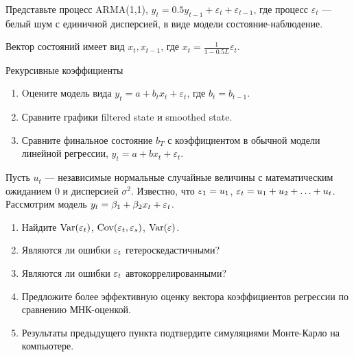 \begin{problem}
Представьте процесс ARMA(1,1),
$y_{t}=0.5y_{t-1}+\varepsilon_{t}+\varepsilon_{t-1}$,
где процесс $\varepsilon_t$ —  белый шум с единичной дисперсией, в
виде модели состояние-наблюдение.

Вектор состояний имеет вид $x_{t},x_{t-1}$, где
$x_{t}=\frac{1}{1-0.5L}\varepsilon_{t}$.


\begin{sol}
\end{sol}
\end{problem}



\begin{problem}
Рекурсивные коэффициенты
\begin{enumerate}
\item Oцените модель вида $y_{t}=a+b_{t}x_{t}+\varepsilon_{t}$,
где $b_{t}=b_{t-1}$.
\item Сравните графики filtered state и smoothed state.
\item Сравните финальное состояние $b_{T}$ с коэффициентом в
обычной модели линейной регрессии, $y_{t}=a+bx_{t}+\varepsilon_{t}$.
\end{enumerate}


\begin{sol}
\end{sol}
\end{problem}



\begin{problem}
Пусть $u_t$ — независимые нормальные случайные величины с
математическим ожиданием $0$ и дисперсией $\sigma^2$. Известно, что $\varepsilon_1=u_1$, $\varepsilon_t=u_1+u_2+\ldots+u_t$. Рассмотрим модель $y_t=\beta_1+\beta_2 x_t + \varepsilon_t$.

\begin{enumerate}
\item Найдите $\operatorname{Var}(\varepsilon_t)$, $\operatorname{Cov}(\varepsilon_t,\varepsilon_s)$, $\operatorname{Var}(\varepsilon)$.
\item Являются ли ошибки $\varepsilon_t$ гетероскедастичными?
\item Являются ли ошибки $\varepsilon_t$ автокоррелированными?
\item Предложите более эффективную оценку вектора коэффициентов регрессии по сравнению МНК-оценкой.
\item Результаты предыдущего пункта подтвердите симуляциями Монте-Карло на компьютере.
\end{enumerate}


\begin{sol}
\end{sol}
\end{problem}



